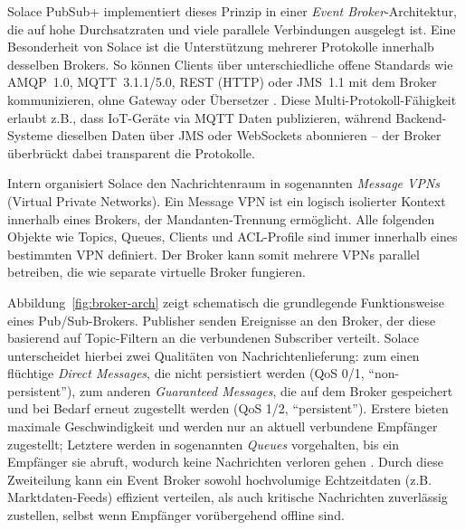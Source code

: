 Solace PubSub+ implementiert dieses Prinzip in einer \textit{Event Broker}-Architektur, die auf hohe Durchsatzraten und viele parallele Verbindungen ausgelegt ist. Eine Besonderheit von Solace ist die Unterstützung mehrerer Protokolle innerhalb desselben Brokers. So können Clients über unterschiedliche offene Standards wie AMQP 1.0, MQTT 3.1.1/5.0, REST (HTTP) oder JMS 1.1 mit dem Broker kommunizieren, ohne Gateway oder Übersetzer \cite{SolaceProtocols}. Diese Multi-Protokoll-Fähigkeit erlaubt z.B., dass IoT-Geräte via MQTT Daten publizieren, während Backend-Systeme dieselben Daten über JMS oder WebSockets abonnieren – der Broker überbrückt dabei transparent die Protokolle.

Intern organisiert Solace den Nachrichtenraum in sogenannten \textit{Message VPNs} (Virtual Private Networks). Ein Message VPN ist ein logisch isolierter Kontext innerhalb eines Brokers, der Mandanten-Trennung ermöglicht. Alle folgenden Objekte wie Topics, Queues, Clients und ACL-Profile sind immer innerhalb eines bestimmten VPN definiert. Der Broker kann somit mehrere VPNs parallel betreiben, die wie separate virtuelle Broker fungieren.

Abbildung \ref{fig:broker-arch} zeigt schematisch die grundlegende Funktionsweise eines Pub/Sub-Brokers. Publisher senden Ereignisse an den Broker, der diese basierend auf Topic-Filtern an die verbundenen Subscriber verteilt. Solace unterscheidet hierbei zwei Qualitäten von Nachrichtenlieferung: zum einen flüchtige \textit{Direct Messages}, die nicht persistiert werden (QoS 0/1, “non-persistent”), zum anderen \textit{Guaranteed Messages}, die auf dem Broker gespeichert und bei Bedarf erneut zugestellt werden (QoS 1/2, “persistent”). Erstere bieten maximale Geschwindigkeit und werden nur an aktuell verbundene Empfänger zugestellt; Letztere werden in sogenannten \textit{Queues} vorgehalten, bis ein Empfänger sie abruft, wodurch keine Nachrichten verloren gehen \cite{SolaceDirectGuaranteed}. Durch diese Zweiteilung kann ein Event Broker sowohl hochvolumige Echtzeitdaten (z.B. Marktdaten-Feeds) effizient verteilen, als auch kritische Nachrichten zuverlässig zustellen, selbst wenn Empfänger vorübergehend offline sind.

